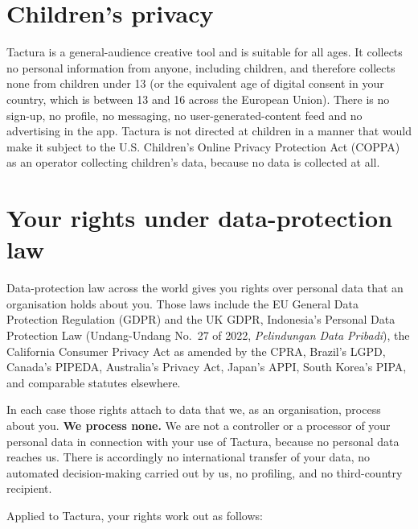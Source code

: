 \documentclass[11pt]{article}
\begin{document}
\section{Children's privacy}

Tactura is a general-audience creative tool and is suitable for all ages. It collects
no personal information from anyone, including children, and therefore collects none
from children under 13 (or the equivalent age of digital consent in your country,
which is between 13 and 16 across the European Union). There is no sign-up, no profile,
no messaging, no user-generated-content feed and no advertising in the app. Tactura is
not directed at children in a manner that would make it subject to the U.S. Children's
Online Privacy Protection Act (COPPA) as an operator collecting children's data,
because no data is collected at all.

\section{Your rights under data-protection law}

Data-protection law across the world gives you rights over personal data that an
organisation holds about you. Those laws include the EU General Data Protection
Regulation (GDPR) and the UK GDPR, Indonesia's Personal Data Protection Law
(Undang-Undang No.\ 27 of 2022, \emph{Pelindungan Data Pribadi}), the California
Consumer Privacy Act as amended by the CPRA, Brazil's LGPD, Canada's PIPEDA,
Australia's Privacy Act, Japan's APPI, South Korea's PIPA, and comparable statutes
elsewhere.

In each case those rights attach to data that we, as an organisation, process about
you. \textbf{We process none.} We are not a controller or a processor of your personal
data in connection with your use of Tactura, because no personal data reaches us. There
is accordingly no international transfer of your data, no automated decision-making
carried out by us, no profiling, and no third-country recipient.

Applied to Tactura, your rights work out as follows:
\end{document}
